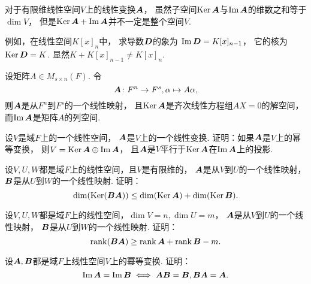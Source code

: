 \begin{remark}
对于有限维线性空间\(V\)上的线性变换\(\boldsymbol{A}\)，
虽然子空间\(\operatorname{Ker}\boldsymbol{A}\)与\(\Im\boldsymbol{A}\)的维数之和等于\(\dim V\)，
但是\(\operatorname{Ker}\boldsymbol{A}+\Im\boldsymbol{A}\)并不一定是整个空间\(V\).

例如，在线性空间\(K[x]_n\)中，
求导数\(\boldsymbol{D}\)的象为
\(\Im\boldsymbol{D}=K[x]_{n-1}\)，
它的核为\(\operatorname{Ker}\boldsymbol{D}=K\).
显然\(K+K[x]_{n-1}\neq K[x]_n\).
\end{remark}

\begin{proposition}
设矩阵\(A \in M_{s \times n}(F)\).
令\[
	\boldsymbol{A}\colon F^n \to F^s, \alpha \mapsto A\alpha,
\]
则\(\boldsymbol{A}\)是从\(F^n\)到\(F^s\)的一个线性映射，
且\(\operatorname{Ker}\boldsymbol{A}\)是齐次线性方程组\(AX=0\)的解空间，
而\(\Im\boldsymbol{A}\)是矩阵\(A\)的列空间.
\end{proposition}

\begin{example}
设\(V\)是域\(F\)上的一个线性空间，
\(\boldsymbol{A}\)是\(V\)上的一个线性变换.
证明：如果\(\boldsymbol{A}\)是\(V\)上的幂等变换，
则\(V = \operatorname{Ker}\boldsymbol{A} \oplus \Im\boldsymbol{A}\)，
且\(\boldsymbol{A}\)是\(V\)平行于\(\operatorname{Ker}\boldsymbol{A}\)在\(\Im\boldsymbol{A}\)上的投影.
\end{example}

\begin{example}
设\(V,U,W\)都是域\(F\)上的线性空间，且\(V\)是有限维的，
\(\boldsymbol{A}\)是从\(V\)到\(U\)的一个线性映射，
\(\boldsymbol{B}\)是从\(U\)到\(W\)的一个线性映射.
证明：\[
	\dim(\operatorname{Ker}(\boldsymbol{B}\boldsymbol{A}))
	\leq
	\dim(\operatorname{Ker}\boldsymbol{A})
	+ \dim(\operatorname{Ker}\boldsymbol{B}).
\]
\end{example}

\begin{example}
设\(V,U,W\)都是域\(F\)上的线性空间，\(\dim V = n,\dim U = m\)，
\(\boldsymbol{A}\)是从\(V\)到\(U\)的一个线性映射，
\(\boldsymbol{B}\)是从\(U\)到\(W\)的一个线性映射.
证明：\[
	\rank(\boldsymbol{B}\boldsymbol{A})
	\geq \rank\boldsymbol{A} + \rank\boldsymbol{B} - m.
\]
\end{example}

\begin{example}
设\(\boldsymbol{A},\boldsymbol{B}\)都是域\(F\)上线性空间\(V\)上的幂等变换.
证明：\[
	\Im\boldsymbol{A} = \Im\boldsymbol{B}
	\iff
	\boldsymbol{A}\boldsymbol{B} = \boldsymbol{B},
	\boldsymbol{B}\boldsymbol{A} = \boldsymbol{A}.
\]
\end{example}

